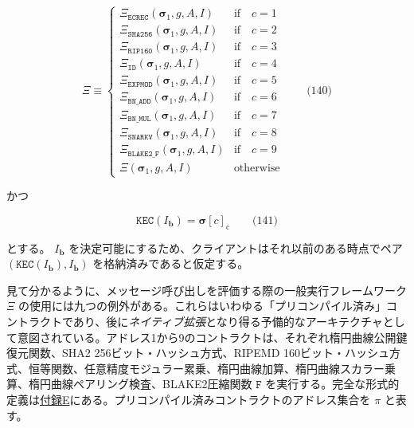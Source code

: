 \documentclass[
]{ltjsarticle}
\begin{document}
\[\Xi \equiv \begin{cases}
\Xi_{\mathtt{ECREC}}    (\boldsymbol{\sigma}_1, g, A, I) & \text{if} \quad c = 1 \\
\Xi_{\mathtt{SHA256}}   (\boldsymbol{\sigma}_1, g, A, I) & \text{if} \quad c = 2 \\
\Xi_{\mathtt{RIP160}}   (\boldsymbol{\sigma}_1, g, A, I) & \text{if} \quad c = 3 \\
\Xi_{\mathtt{ID}}       (\boldsymbol{\sigma}_1, g, A, I) & \text{if} \quad c = 4 \\
\Xi_{\mathtt{EXPMOD}}   (\boldsymbol{\sigma}_1, g, A, I) & \text{if} \quad c = 5 \\
\Xi_{\mathtt{BN\_ADD}}  (\boldsymbol{\sigma}_1, g, A, I) & \text{if} \quad c = 6 \\
\Xi_{\mathtt{BN\_MUL}}  (\boldsymbol{\sigma}_1, g, A, I) & \text{if} \quad c = 7 \\
\Xi_{\mathtt{SNARKV}}   (\boldsymbol{\sigma}_1, g, A, I) & \text{if} \quad c = 8 \\
\Xi_{\mathtt{BLAKE2\_F}}(\boldsymbol{\sigma}_1, g, A, I) & \text{if} \quad c = 9 \\
\Xi                     (\boldsymbol{\sigma}_1, g, A, I) & \text{otherwise} \end{cases} \qquad \text{(140)}\]

かつ

\protect\hypertarget{eq-141}{}{}

\[\mathtt{KEC}(I_{\mathbf{b}}) = \boldsymbol{\sigma}[c]_{\mathrm{c}} \qquad \text{(141)}\]

とする。 \(I_{\mathbf{b}}\)
を決定可能にするため、クライアントはそれ以前のある時点でペア
\((\mathtt{KEC}(I_{\mathbf{b}}), I_{\mathbf{b}})\)
を格納済みであると仮定する。

見て分かるように、メッセージ呼び出しを評価する際の一般実行フレームワーク
\(\Xi\)
の使用には九つの例外がある。これらはいわゆる「プリコンパイル済み」コントラクトであり、後に\emph{ネイティブ拡張}となり得る予備的なアーキテクチャとして意図されている。アドレス1から9のコントラクトは、それぞれ楕円曲線公開鍵復元関数、SHA2
256ビット・ハッシュ方式、RIPEMD
160ビット・ハッシュ方式、恒等関数、任意精度モジュラー累乗、楕円曲線加算、楕円曲線スカラー乗算、楕円曲線ペアリング検査、BLAKE2圧縮関数
\(\mathtt{F}\)
を実行する。完全な形式的定義は\protect\hyperlink{app:precompiled}{付録E}にある。\protect\hypertarget{precompiled_set}{}{}プリコンパイル済みコントラクトのアドレス集合を
\(\pi\) と表す。

\protect\hypertarget{eq-142}{}{}
\end{document}
